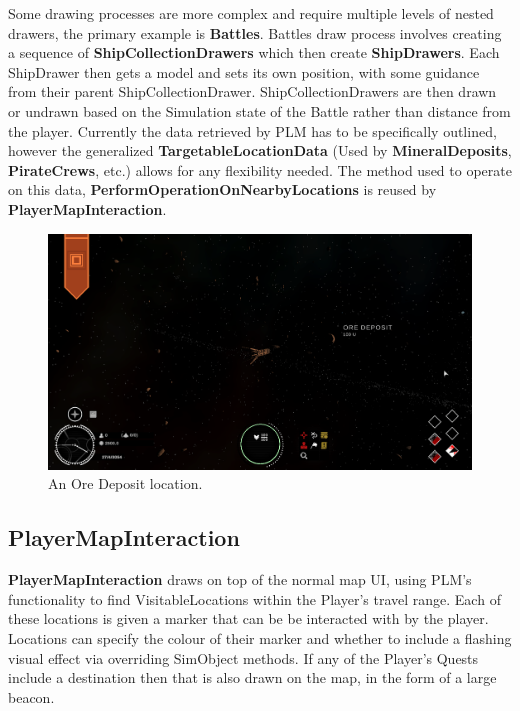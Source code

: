 \documentclass{report}
\begin{document}
Some drawing processes are more complex and require multiple levels of nested drawers, the primary example is \textbf{Battles}. Battles draw process involves creating a sequence of \textbf{ShipCollectionDrawers} which then create \textbf{ShipDrawers}. Each ShipDrawer then gets a model and sets its own position, with some guidance from their parent ShipCollectionDrawer. ShipCollectionDrawers are then drawn or undrawn based on the Simulation state of the Battle rather than distance from the player.
\newline
\newline
Currently the data retrieved by PLM has to be specifically outlined, however the generalized \textbf{TargetableLocationData} (Used by \textbf{MineralDeposits}, \textbf{PirateCrews}, etc.) allows for any flexibility needed. The method used to operate on this data, \textbf{PerformOperationOnNearbyLocations} is reused by \textbf{PlayerMapInteraction}.

\begin{figure}[H]
	\centering
    \includegraphics[width=.8\textwidth]{locationExample.png}
    \caption{An Ore Deposit location.}
\end{figure}

\subsection{PlayerMapInteraction}

\textbf{PlayerMapInteraction} draws on top of the normal map UI, using PLM's functionality to find VisitableLocations within the Player's travel range. Each of these locations is given a marker that can be be interacted with by the player. Locations can specify the colour of their marker and whether to include a flashing visual effect via overriding SimObject methods. If any of the Player's Quests include a destination then that is also drawn on the map, in the form of a large beacon.
\end{document}
